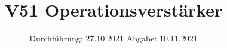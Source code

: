 

\subject{Fortgeschrittenenpraktikum}
\title{V51 Operationsverstärker}
\date{%
  Durchführung: 27.10.2021
  \hspace{3em}
  Abgabe: 10.11.2021
}



\maketitle
\thispagestyle{empty}
\tableofcontents
\newpage






\printbibliography{}


